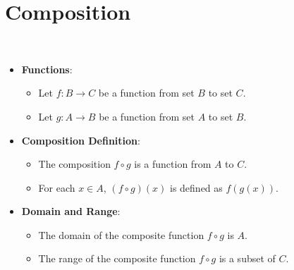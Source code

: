 \section{Composition}
\begin{remark}
\ \begin{itemize}
	\item \textbf{Functions}:
	\begin{itemize}
		\item Let \( f: B \to C \) be a function from set \( B \) to set \( C \).
		\item Let \( g: A \to B \) be a function from set \( A \) to set \( B \).
	\end{itemize}
	
	\item \textbf{Composition Definition}:
	\begin{itemize}
		\item The composition \( f \circ g \) is a function from \( A \) to \( C \).
		\item For each \( x \in A \), \( (f \circ g)(x) \) is defined as \( f(g(x)) \).
	\end{itemize}
	
	\item \textbf{Domain and Range}:
	\begin{itemize}
		\item The domain of the composite function \( f \circ g \) is \( A \).
		\item The range of the composite function \( f \circ g \) is a subset of \( C \).
	\end{itemize}
\end{itemize}
\end{remark}
\vspace{12pt}
